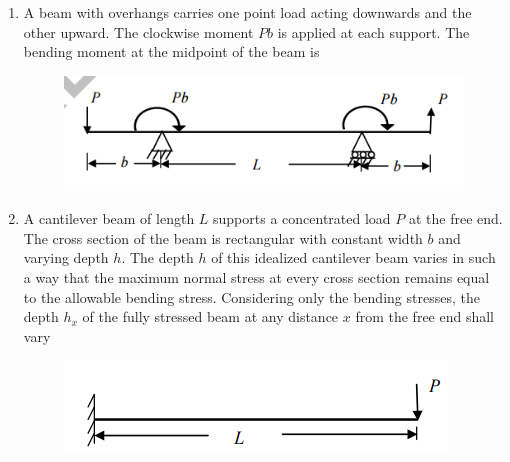 \documentclass[a4paper,10pt]{article}
\begin{document}
\begin{enumerate}
    \hfill{}
    
    \item A beam with overhangs carries one point load acting downwards and the other upward. The clockwise moment $Pb$ is applied at each support. The bending moment at the midpoint of the beam is
    \begin{figure}[H] \centering \includegraphics[width=0.7\columnwidth]{q13_solid.png} \caption*{} \label{fig:q13_solid} \end{figure}
    
    \hfill{}
    \begin{enumerate}[label=\Alph*)]
    \end{enumerate}
    
    \item A cantilever beam of length $L$ supports a concentrated load $P$ at the free end. The cross section of the beam is rectangular with constant width $b$ and varying depth $h$. The depth $h$ of this idealized cantilever beam varies in such a way that the maximum normal stress at every cross section remains equal to the allowable bending stress. Considering only the bending stresses, the depth $h_x$ of the fully stressed beam at any distance $x$ from the free end shall vary
    \begin{figure}[H] \centering \includegraphics[width=0.6\columnwidth]{q14_solid.png} \caption*{} \label{fig:q14_solid} \end{figure}
    
    \hfill{}
    \begin{enumerate}[label=\Alph*)]
    \end{enumerate}
    

\end{enumerate}
\end{document}
